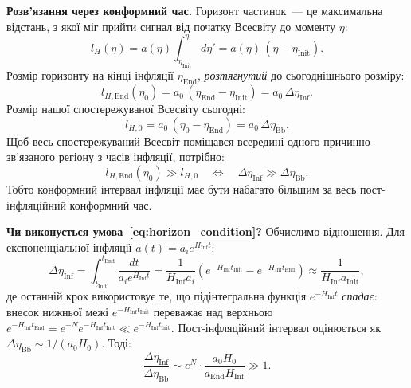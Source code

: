 \textbf{Розв'язання через конформний час.}
Горизонт частинок~--- це максимальна відстань, з якої
міг прийти сигнал від початку Всесвіту до моменту $\eta$:
\begin{equation*}
	l_H(\eta) = a(\eta)\int_{\eta_{\text{Init}}}^{\eta} d\eta'
	= a(\eta)\,(\eta - \eta_{\text{Init}}).
\end{equation*}
Розмір горизонту на кінці інфляції $\eta_{\text{End}}$,
\emph{розтягнутий} до сьогоднішнього розміру:
\begin{equation}\label{eq:horizon_today}
	l_{H,\text{End}}(\eta_0) = a_0\,(\eta_{\text{End}} - \eta_{\text{Init}})
	= a_0\,\Delta\eta_{\text{Inf}}.
\end{equation}
Розмір нашої спостережуваної Всесвіту сьогодні:
\begin{equation}\label{eq:observable_universe}
	l_{H,0} = a_0\,(\eta_0 - \eta_{\text{End}}) = a_0\,\Delta\eta_{\text{Bb}}.
\end{equation}
Щоб весь спостережуваний Всесвіт поміщався всередині одного
причинно-зв'я\-за\-ного регіону з часів інфляції, потрібно:
\begin{equation}\label{eq:horizon_condition}
	\boxed{l_{H,\text{End}}(\eta_0) \gg l_{H,0}
		\quad\Leftrightarrow\quad
		\Delta\eta_{\text{Inf}} \gg \Delta\eta_{\text{Bb}}.}
\end{equation}
Тобто конформний інтервал інфляції має бути набагато більшим
за весь пост-інфляційний конформний час.

\textbf{Чи виконується умова~\eqref{eq:horizon_condition}?}
Обчислимо відношення. Для експоненціальної інфляції $a(t) = a_i e^{H_{\text{Inf}} t}$:
\begin{equation*}
	\Delta\eta_{\text{Inf}}
	= \int_{t_{\text{Init}}}^{t_{\text{End}}} \frac{dt}{a_i e^{H_{\text{Inf}} t}}
	= \frac{1}{H_{\text{Inf}} a_i}\left(e^{-H_{\text{Inf}}t_{\text{Init}}}
	  - e^{-H_{\text{Inf}}t_{\text{End}}}\right)
	\approx \frac{1}{H_{\text{Inf}} a_{\text{Init}}},
\end{equation*}
де останній крок використовує те, що підінтегральна функція
$e^{-H_{\text{Inf}}t}$ \emph{спадає}: внесок нижньої межі
$e^{-H_{\text{Inf}}t_{\text{Init}}}$ переважає над верхньою
$e^{-H_{\text{Inf}}t_{\text{End}}} = e^{-N} e^{-H_{\text{Inf}}t_{\text{Init}}} \ll e^{-H_{\text{Inf}}t_{\text{Init}}}$.
Пост-інфляційний інтервал оцінюється як $\Delta\eta_{\text{Bb}} \sim 1/(a_0 H_0)$. Тоді:
\begin{equation}\label{eq:horizon_ratio}
	\frac{\Delta\eta_{\text{Inf}}}{\Delta\eta_{\text{Bb}}} \sim e^N \cdot \frac{a_0 H_0}{a_{\text{End}} H_{\text{Inf}}} \gg 1.
\end{equation}

